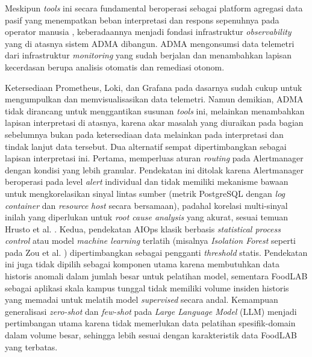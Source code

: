 Meskipun \textit{tools} ini secara fundamental beroperasi sebagai platform agregasi data pasif yang menempatkan beban interpretasi dan respons sepenuhnya pada operator manusia \cite{hrusto2025monitoring}, keberadaannya menjadi fondasi infrastruktur \textit{observability} yang di atasnya sistem ADMA dibangun. ADMA mengonsumsi data telemetri dari infrastruktur \textit{monitoring} yang sudah berjalan dan menambahkan lapisan kecerdasan berupa analisis otomatis dan remediasi otonom.

Ketersediaan Prometheus, Loki, dan Grafana pada dasarnya sudah cukup untuk mengumpulkan dan memvisualisasikan data telemetri. Namun demikian, ADMA tidak dirancang untuk menggantikan susunan \textit{tools} ini, melainkan menambahkan lapisan interpretasi di atasnya, karena akar masalah yang diuraikan pada bagian sebelumnya bukan pada ketersediaan data melainkan pada interpretasi dan tindak lanjut data tersebut. Dua alternatif sempat dipertimbangkan sebagai lapisan interpretasi ini. Pertama, memperluas aturan \textit{routing} pada Alertmanager dengan kondisi yang lebih granular. Pendekatan ini ditolak karena Alertmanager beroperasi pada level \textit{alert} individual dan tidak memiliki mekanisme bawaan untuk mengkorelasikan sinyal lintas sumber (metrik PostgreSQL dengan \textit{log} \textit{container} dan \textit{resource} \textit{host} secara bersamaan), padahal korelasi multi-sinyal inilah yang diperlukan untuk \textit{root cause analysis} yang akurat, sesuai temuan Hrusto et al. \cite{hrusto2025monitoring}. Kedua, pendekatan AIOps klasik berbasis \textit{statistical process control} atau model \textit{machine learning} terlatih (misalnya \textit{Isolation Forest} seperti pada Zou et al. \cite{zou2022docker}) dipertimbangkan sebagai pengganti \textit{threshold} statis. Pendekatan ini juga tidak dipilih sebagai komponen utama karena membutuhkan data historis anomali dalam jumlah besar untuk pelatihan model, sementara FoodLAB sebagai aplikasi skala kampus tunggal tidak memiliki volume insiden historis yang memadai untuk melatih model \textit{supervised} secara andal. Kemampuan generalisasi \textit{zero-shot} dan \textit{few-shot} pada \textit{Large Language Model} (LLM) menjadi pertimbangan utama karena tidak memerlukan data pelatihan spesifik-domain dalam volume besar, sehingga lebih sesuai dengan karakteristik data FoodLAB yang terbatas.

